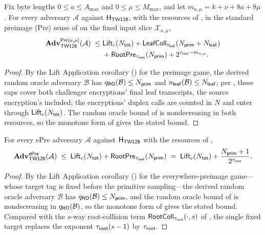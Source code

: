 \begin{theorem}
\label{thm:pre}
Fix byte lengths $0 \leq a \leq A_{\max}$ and
$0 \leq \mu \leq M_{\max}$, and let
$m_{a,\mu}=k+\nu+8a+8\mu$. For every adversary $\mathcal{A}$ against
$\mathsf{H}_{\mathsf{TW128}}$, with the resources of , in the standard
preimage (Pre) sense of \cite{RS04} on the fixed input slice
$\mathcal{X}_{a,\mu}$,
\[
\begin{aligned}
  \mathbf{Adv}^{\mathsf{Pre}[a,\mu]}_{\textsf{TW128}}(\mathcal{A})
  \;\leq\;&
  \mathsf{Lift}_c(N_{\mathsf{tot}})
  + \mathsf{LeafColl}_{\tau_{\mathsf{leaf}}}(N_{\mathsf{prim}}+N_{\mathsf{leaf}}) \\
  &+ \mathsf{RootPre}_{\tau_{\mathsf{root}}}(N_{\mathsf{prim}})
  + 2^{\tau_{\mathsf{root}} - m_{a,\mu}}.
\end{aligned}
\]
\end{theorem}

\begin{proof}
By the Lift Application corollary () for the
preimage game, the derived random oracle adversary $\mathcal{B}$ has
$q_{\mathsf{RO}}(\mathcal{B}) \leq N_{\mathsf{prim}}$ and
$n_{\mathsf{leaf}}(\mathcal{B}) \leq N_{\mathsf{leaf}}$; per , these caps
cover both challenger encryptions' final leaf transcripts, the source
encryption's included; the encryptions' duplex calls are counted in $N$
and enter through $\mathsf{Lift}_c(N_{\mathsf{tot}})$. The random oracle bound of
 is nondecreasing in both resources, so the monotone form
of  gives the stated bound.
\end{proof}

\begin{theorem}
\label{thm:epre}
For every ePre adversary $\mathcal{A}$ against $\mathsf{H}_{\mathsf{TW128}}$ with the
resources of ,
\[
  \mathbf{Adv}^{\mathsf{ePre}}_{\textsf{TW128}}(\mathcal{A})
  \;\leq\;
  \mathsf{Lift}_c(N_{\mathsf{tot}}) + \mathsf{RootPre}_{\tau_{\mathsf{root}}}(N_{\mathsf{prim}})
  \;=\;
  \mathsf{Lift}_c(N_{\mathsf{tot}}) + \frac{N_{\mathsf{prim}} + 1}{2^{\tau_{\mathsf{root}}}}.
\]
\end{theorem}

\begin{proof}
By the Lift Application corollary () for the
everywhere-preimage game---whose target tag is fixed before the
primitive
sampling---the derived random oracle adversary $\mathcal{B}$ has
$q_{\mathsf{RO}}(\mathcal{B}) \leq N_{\mathsf{prim}}$, and the random oracle bound of
 is nondecreasing in $q_{\mathsf{RO}}(\mathcal{B})$, so the monotone
form of  gives the stated bound. Compared with the
$s$-way root-collision term $\mathsf{RootColl}_{\tau_{\mathsf{root}}}(\cdot, s)$ of
, the single fixed target replaces the exponent
$\tau_{\mathsf{root}}(s-1)$ by $\tau_{\mathsf{root}}$.
\end{proof}

